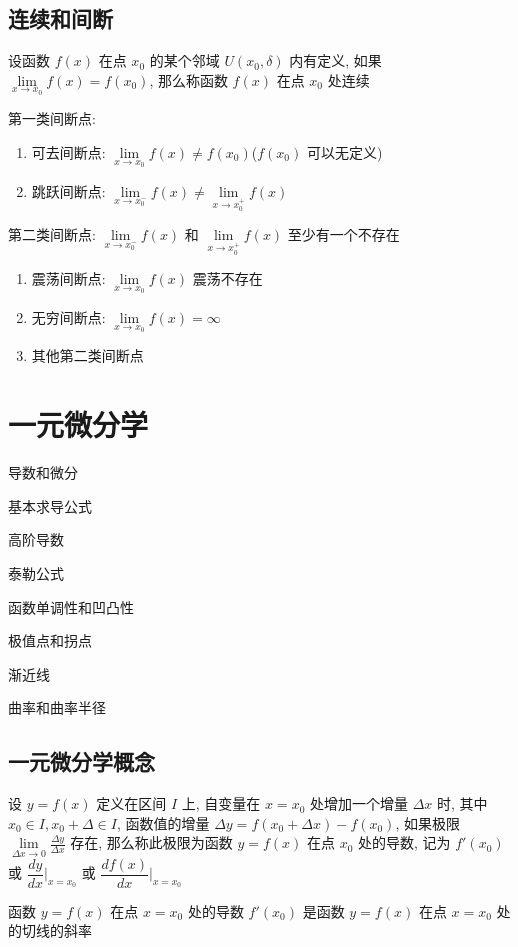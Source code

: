 \section{连续和间断}
\begin{definition}[连续点]
	设函数 $f(x)$ 在点 $x_{0}$ 的某个邻域 $U(x_{0},\delta)$ 内有定义, 如果 $\lim\limits_{x\to x_{0}}f(x)=f(x_{0})$, 那么称函数 $f(x)$ 在点 $x_{0}$ 处连续
\end{definition}

\begin{definition}[间断点]
	第一类间断点:
	\begin{enumerate}
		\item 可去间断点: $\lim\limits_{x\to x_{0}}f(x)\neq f(x_{0})$($f(x_{0})$ 可以无定义)
		\item 跳跃间断点: $\lim\limits_{x\to x_{0}^{-}}f(x)\neq \lim\limits_{x\to x_{0}^{+}}f(x)$
	\end{enumerate}

	第二类间断点: $\lim\limits_{x\to x_{0}^{-}}f(x)$ 和 $\lim\limits_{x\to x_{0}^{+}}f(x)$ 至少有一个不存在
	\begin{enumerate}
		\item 震荡间断点: $\lim\limits_{x\to x_{0}}f(x)$ 震荡不存在
		\item 无穷间断点: $\lim\limits_{x\to x_{0}}f(x)=\infty$
		\item 其他第二类间断点
	\end{enumerate}
\end{definition}
\chapter{一元微分学}
\begin{introduction}
	\item 导数和微分
	\item 基本求导公式
	\item 高阶导数
	\item 泰勒公式
	\item 函数单调性和凹凸性
	\item 极值点和拐点
	\item 渐近线
	\item 曲率和曲率半径
\end{introduction}

\section{一元微分学概念}
\begin{definition}[导数]
	设 $y=f(x)$ 定义在区间 $I$ 上, 自变量在 $x=x_{0}$ 处增加一个增量 $\Delta x$ 时, 其中 $x_{0}\in I, x_{0}+\Delta\in I$, 函数值的增量 $\Delta y=f(x_{0}+\Delta x)-f(x_{0})$, 如果极限 $\lim\limits_{\Delta x\to 0}\frac{\Delta y}{\Delta x}$ 存在, 那么称此极限为函数 $y=f(x)$ 在点 $x_{0}$ 处的导数, 记为 $f'(x_{0})$ 或 $\dfrac{dy}{dx}|_{x=x_{0}}$ 或 $\dfrac{df(x)}{dx}|_{x=x_{0}}$
\end{definition}
\begin{definition}[导数的几何意义]
	函数 $y=f(x)$ 在点 $x=x_{0}$ 处的导数 $f'(x_{0})$ 是函数 $y=f(x)$ 在点 $x=x_{0}$ 处的切线的斜率
\end{definition}

